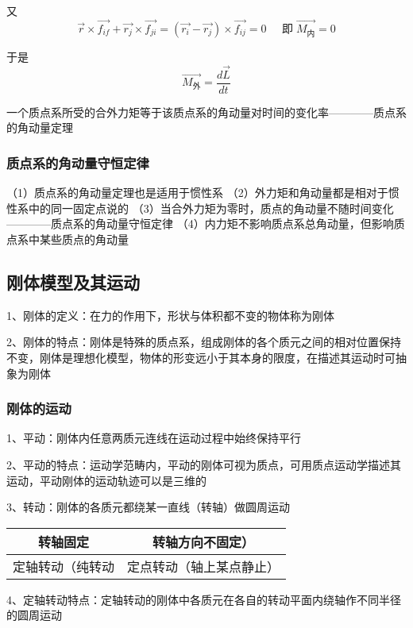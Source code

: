 \documentclass[UTF8]{article}
\begin{document}
    又\[\vec{r}\times\vec{f_{if}} + \vec{r_j}\times\vec{f_{ji}} = (\vec{r_i} - \vec{r_j})\times\vec{f_{ij}} = 0\;\;\;\;\;\mbox{即}\;\vec{M_{\mbox{内}}} = 0\]

    于是\[\vec{M_{\mbox{外}}} = \frac{d\vec{L}}{dt}\]

    一个质点系所受的合外力矩等于该质点系的角动量对时间的变化率————质点系的角动量定理

\subsubsection{质点系的角动量守恒定律}

    （1）质点系的角动量定理也是适用于惯性系
    （2）外力矩和角动量都是相对于惯性系中的同一固定点说的
    （3）当合外力矩为零时，质点的角动量不随时间变化————质点系的角动量守恒定律
    （4）内力矩不影响质点系总角动量，但影响质点系中某些质点的角动量

\subsection{刚体模型及其运动}

    1、刚体的定义：在力的作用下，形状与体积都不变的物体称为刚体

    2、刚体的特点：刚体是特殊的质点系，组成刚体的各个质元之间的相对位置保持不变，刚体是理想化模型，物体的形变远小于其本身的限度，在描述其运动时可抽象为刚体

\subsubsection{刚体的运动}

    1、平动：刚体内任意两质元连线在运动过程中始终保持平行

    2、平动的特点：运动学范畴内，平动的刚体可视为质点，可用质点运动学描述其运动，平动刚体的运动轨迹可以是三维的

    3、转动：刚体的各质元都绕某一直线（转轴）做圆周运动

    \begin{tabular}{|c|c|}%
        \hline  %
        转轴固定&转轴方向不固定）\\
        \hline  %
        定轴转动（纯转动&定点转动（轴上某点静止）\\
        \hline %
    \end{tabular}

    4、定轴转动特点：定轴转动的刚体中各质元在各自的转动平面内绕轴作不同半径的圆周运动
\end{document}

